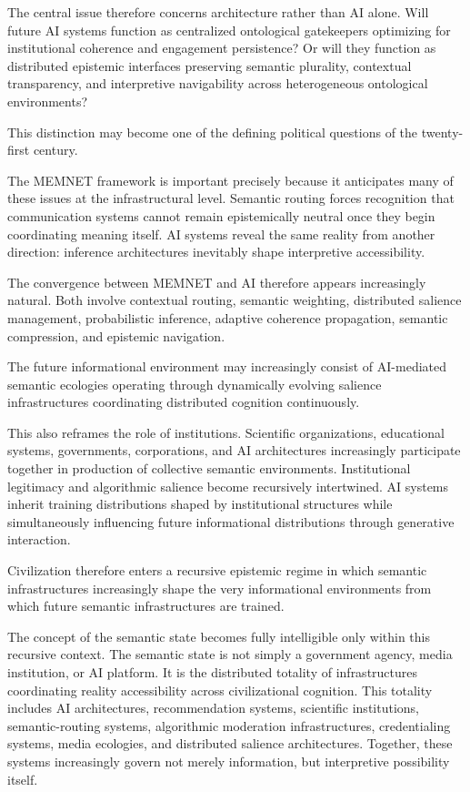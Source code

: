 \documentclass[11pt,a4paper]{article}
\begin{document}
The central issue therefore concerns architecture rather than AI alone. Will future AI systems function as centralized ontological gatekeepers optimizing for institutional coherence and engagement persistence? Or will they function as distributed epistemic interfaces preserving semantic plurality, contextual transparency, and interpretive navigability across heterogeneous ontological environments?

This distinction may become one of the defining political questions of the twenty-first century.

The MEMNET framework is important precisely because it anticipates many of these issues at the infrastructural level. Semantic routing forces recognition that communication systems cannot remain epistemically neutral once they begin coordinating meaning itself. AI systems reveal the same reality from another direction: inference architectures inevitably shape interpretive accessibility.

The convergence between MEMNET and AI therefore appears increasingly natural. Both involve contextual routing, semantic weighting, distributed salience management, probabilistic inference, adaptive coherence propagation, semantic compression, and epistemic navigation.

The future informational environment may increasingly consist of AI-mediated semantic ecologies operating through dynamically evolving salience infrastructures coordinating distributed cognition continuously.

This also reframes the role of institutions. Scientific organizations, educational systems, governments, corporations, and AI architectures increasingly participate together in production of collective semantic environments. Institutional legitimacy and algorithmic salience become recursively intertwined. AI systems inherit training distributions shaped by institutional structures while simultaneously influencing future informational distributions through generative interaction.

Civilization therefore enters a recursive epistemic regime in which semantic infrastructures increasingly shape the very informational environments from which future semantic infrastructures are trained.

The concept of the semantic state becomes fully intelligible only within this recursive context. The semantic state is not simply a government agency, media institution, or AI platform. It is the distributed totality of infrastructures coordinating reality accessibility across civilizational cognition. This totality includes AI architectures, recommendation systems, scientific institutions, semantic-routing systems, algorithmic moderation infrastructures, credentialing systems, media ecologies, and distributed salience architectures. Together, these systems increasingly govern not merely information, but interpretive possibility itself.
\end{document}
